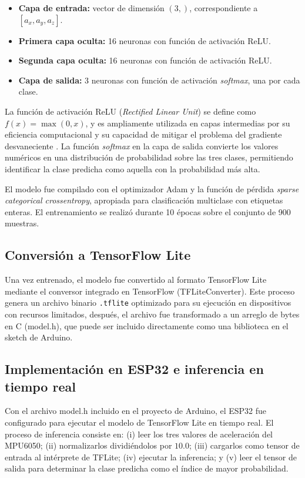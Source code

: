 \documentclass[conference]{IEEEtran}
\begin{document}
\begin{itemize}
    \item \textbf{Capa de entrada:} vector de dimensión $(3,)$, correspondiente a $[a_x, a_y, a_z]$.
    \item \textbf{Primera capa oculta:} 16 neuronas con función de activación ReLU.
    \item \textbf{Segunda capa oculta:} 16 neuronas con función de activación ReLU.
    \item \textbf{Capa de salida:} 3 neuronas con función de activación \textit{softmax}, una por cada clase.
\end{itemize}

La función de activación ReLU (\textit{Rectified Linear Unit}) se define como $f(x) = \max(0, x)$, y es ampliamente utilizada en capas intermedias por su eficiencia computacional y su capacidad de mitigar el problema del gradiente desvaneciente \cite{goodfellow2016}. La función \textit{softmax} en la capa de salida convierte los valores numéricos en una distribución de probabilidad sobre las tres clases, permitiendo identificar la clase predicha como aquella con la probabilidad más alta.

El modelo fue compilado con el optimizador Adam y la función de pérdida \textit{sparse categorical crossentropy}, apropiada para clasificación multiclase con etiquetas enteras. El entrenamiento se realizó durante 10 épocas sobre el conjunto de 900 muestras.

\subsection{Conversión a TensorFlow Lite}

Una vez entrenado, el modelo fue convertido al formato TensorFlow Lite mediante el conversor integrado en TensorFlow (TFLiteConverter). Este proceso genera un archivo binario \texttt{.tflite} optimizado para su ejecución en dispositivos con recursos limitados, después, el archivo fue transformado a un arreglo de bytes en C (model.h), que puede ser incluido directamente como una biblioteca en el sketch de Arduino.

\subsection{Implementación en ESP32 e inferencia en tiempo real}

Con el archivo model.h incluido en el proyecto de Arduino, el ESP32 fue configurado para ejecutar el modelo de TensorFlow Lite en tiempo real. El proceso de inferencia consiste en: (i) leer los tres valores de aceleración del MPU6050; (ii) normalizarlos dividiéndolos por $10.0$; (iii) cargarlos como tensor de entrada al intérprete de TFLite; (iv) ejecutar la inferencia; y (v) leer el tensor de salida para determinar la clase predicha como el índice de mayor probabilidad.
\end{document}
